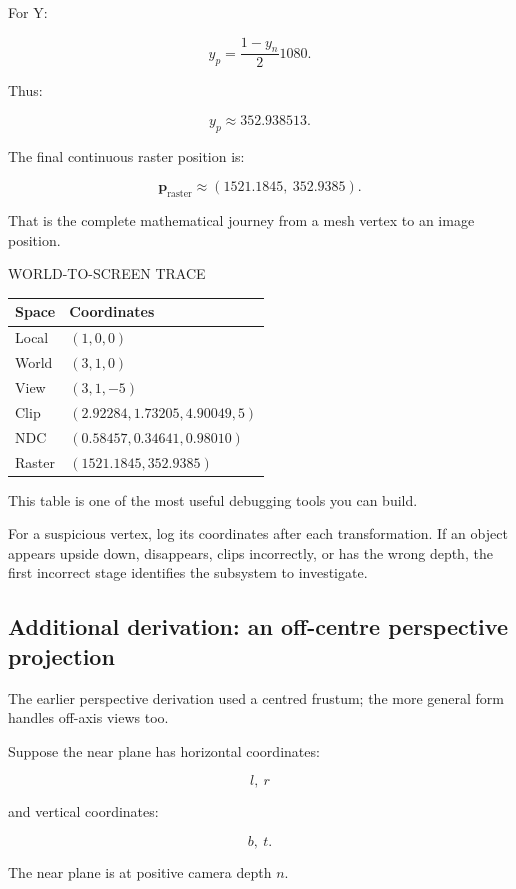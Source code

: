 For Y:

\[
 y_p=\frac{1-y_n}{2}1080.
\]

Thus:

\[
 \boxed{y_p\approx352.938513}.
\]

The final continuous raster position is:

\[
 \boxed{ \mathbf p_{\mathrm{raster}} \approx (1521.1845,\ 352.9385) }.
\]

That is the complete mathematical journey from a mesh vertex to an image position.

WORLD-TO-SCREEN TRACE

{\def\LTcaptype{none} %
\begin{longtable}[]{@{}ll@{}}
\toprule\noalign{}
Space & Coordinates \\
\midrule\noalign{}
\endhead
\bottomrule\noalign{}
\endlastfoot
Local & \((1,0,0)\) \\
World & \((3,1,0)\) \\
View & \((3,1,-5)\) \\
Clip & \((2.92284,1.73205,4.90049,5)\) \\
NDC & \((0.58457,0.34641,0.98010)\) \\
Raster & \((1521.1845,352.9385)\) \\
\end{longtable}
}

This table is one of the most useful debugging tools you can build.

For a suspicious vertex, log its coordinates after each transformation. If an object appears upside down, disappears, clips incorrectly, or has the wrong depth, the first incorrect stage identifies the subsystem to investigate.

\subsection{Additional derivation: an off-centre perspective projection}\label{02-foundations-ii-ch037-additional-derivation-an-off-centre-perspective-projection}

The earlier perspective derivation used a centred frustum; the more general form handles off-axis views too.

Suppose the near plane has horizontal coordinates:

\[
 l,\ r
\]

and vertical coordinates:

\[
 b,\ t.
\]

The near plane is at positive camera depth \(n\).

